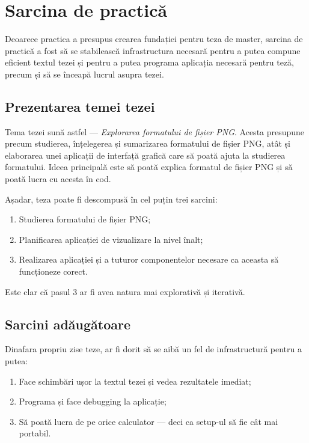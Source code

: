 \documentclass[a4paper,12pt]{report}
\begin{document}
\chapter{Sarcina de practică}

Deoarece practica a presupus crearea fundației pentru teza de master,
sarcina de practică a fost să se stabilească infrastructura necesară pentru a putea compune
eficient textul tezei și pentru a putea programa aplicația necesară pentru teză,
precum și să se înceapă lucrul asupra tezei.


\section{Prezentarea temei tezei}

Tema tezei sună astfel --- \textit{Explorarea formatului de fișier PNG}.
Acesta presupune precum studierea, înțelegerea și sumarizarea formatului de fișier PNG,
atât și elaborarea unei aplicații de interfață grafică care să poată ajuta la studierea formatului.
Ideea principală este să poată explica formatul de fișier PNG 
și să poată lucra cu acesta în cod.

Așadar, teza poate fi descompusă în cel puțin trei sarcini:
\begin{enumerate}
  \item Studierea formatului de fișier PNG;
  \item Planificarea aplicației de vizualizare la nivel înalt;
  \item Realizarea aplicației și a tuturor componentelor necesare ca aceasta să funcționeze corect.
\end{enumerate}
Este clar că pasul 3 ar fi avea natura mai explorativă și iterativă.


\section{Sarcini adăugătoare}

Dinafara propriu zise teze, ar fi dorit să se aibă un fel de infrastructură pentru a putea:
\begin{enumerate}
  \item Face schimbări ușor la textul tezei și vedea rezultatele imediat;
  \item Programa și face debugging la aplicație;
  \item Să poată lucra de pe orice calculator --- deci ca setup-ul să fie cât mai portabil.
\end{enumerate}
\end{document}
